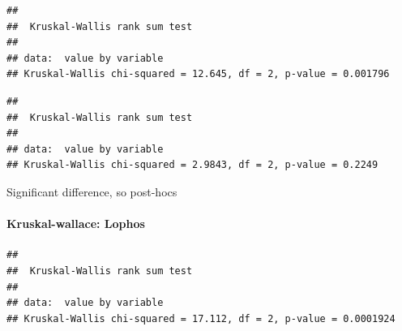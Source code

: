 \documentclass[]{article}
\newenvironment{Shaded}{\begin{snugshade}}{\end{snugshade}}
\newcommand{\KeywordTok}[1]{\textcolor[rgb]{0.13,0.29,0.53}{\textbf{{#1}}}}
\newcommand{\DataTypeTok}[1]{\textcolor[rgb]{0.13,0.29,0.53}{{#1}}}
\newcommand{\StringTok}[1]{\textcolor[rgb]{0.31,0.60,0.02}{{#1}}}
\newcommand{\NormalTok}[1]{{#1}}
\let\oldparagraph\paragraph
\renewcommand{\paragraph}[1]{\oldparagraph{#1}\mbox{}}
\begin{document}
\begin{verbatim}
## 
##  Kruskal-Wallis rank sum test
## 
## data:  value by variable
## Kruskal-Wallis chi-squared = 12.645, df = 2, p-value = 0.001796
\end{verbatim}

\begin{Shaded}
\end{Shaded}

\begin{verbatim}
## 
##  Kruskal-Wallis rank sum test
## 
## data:  value by variable
## Kruskal-Wallis chi-squared = 2.9843, df = 2, p-value = 0.2249
\end{verbatim}

Significant difference, so post-hocs

\paragraph{Kruskal-wallace: Lophos}\label{kruskal-wallace-lophos-1}

\begin{Shaded}
\end{Shaded}

\begin{verbatim}
## 
##  Kruskal-Wallis rank sum test
## 
## data:  value by variable
## Kruskal-Wallis chi-squared = 17.112, df = 2, p-value = 0.0001924
\end{verbatim}

\begin{Shaded}
\end{Shaded}
\end{document}
